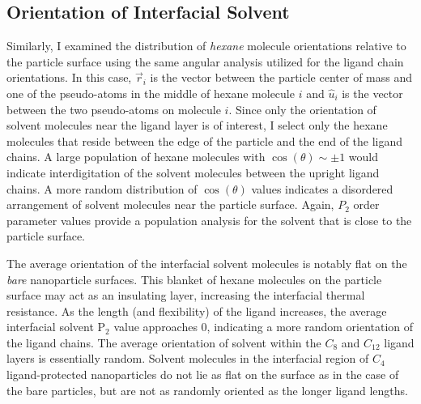 \subsection{Orientation of Interfacial Solvent}

Similarly, I examined the distribution of \emph{hexane} molecule
orientations relative to the particle surface using the same angular
analysis utilized for the ligand chain orientations. In this case,
$\vec{r}_i$ is the vector between the particle center of mass and one
of the  pseudo-atoms in the middle of hexane molecule $i$ and
$\hat{u}_i$ is the vector between the two  pseudo-atoms on
molecule $i$. Since only the orientation of
solvent molecules near the ligand layer is of interest, 
I select only the hexane
molecules that reside between the edge of the
particle and the end of the ligand chains. A large population of
hexane molecules with $\cos{(\theta)} \sim \pm 1$ would indicate
interdigitation of the solvent molecules between the upright ligand
chains. A more random distribution of $\cos{(\theta)}$ values
indicates a disordered arrangement of solvent molecules near the particle
surface. Again, $P_2$ order parameter values provide a population
analysis for the solvent that is close to the particle surface.

The average orientation of the interfacial solvent molecules is
notably flat on the \emph{bare} nanoparticle surfaces. This blanket of
hexane molecules on the particle surface may act as an insulating
layer, increasing the interfacial thermal resistance. As the length
(and flexibility) of the ligand increases, the average interfacial
solvent P$_2$ value approaches 0, indicating a more random orientation
of the ligand chains. The average orientation of solvent within the
$C_8$ and $C_{12}$ ligand layers is essentially random. Solvent
molecules in the interfacial region of $C_4$ ligand-protected
nanoparticles do not lie as flat on the surface as in the case of the
bare particles, but are not as randomly oriented as the longer ligand
lengths.

